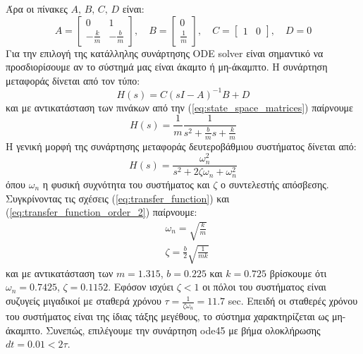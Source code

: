 \documentclass[a4paper,12pt]{article}
\begin{document}
Άρα οι πίνακες $A, \, B, \, C, \, D$ είναι:
\begin{equation}
    A = 
    \begin{bmatrix}
        0 & 1 \\
        -\frac{k}{m} & -\frac{b}{m}
    \end{bmatrix}, \quad B = 
    \begin{bmatrix}
        0 \\
        \frac{1}{m}
    \end{bmatrix}, \quad C = 
    \begin{bmatrix}
        1 & 0
    \end{bmatrix}, \quad D = 0
    \label{eq:state_space_matrices}
\end{equation}
Για την επιλογή της κατάλληλης συνάρτησης ODE solver είναι
σημαντικό να προσδιορίσουμε αν το σύστημά μας είναι άκαμτο ή μη-άκαμπτο. Η συνάρτηση μεταφοράς δίνεται από
τον τύπο:
\begin{equation*}
    H(s) = C(sI-A)^{-1}B + D
\end{equation*}
και με αντικατάσταση των πινάκων από την (\ref{eq:state_space_matrices}) παίρνουμε
\begin{equation}
    H(s) = \frac{1}{m} \frac{1}{s^2 + \frac{b}{m}s + \frac{k}{m}}
    \label{eq:transfer_function}
\end{equation}
Η γενική μορφή της συνάρτησης μεταφοράς δευτεροβάθμιου συστήματος δίνεται από:
\begin{equation}
    H(s) = \frac{\omega_n^2}{s^2 + 2 \zeta \omega_n + \omega_n^2}
    \label{eq:transfer_function_order_2}
\end{equation}
όπου $\omega_n$ η φυσική συχνότητα του συστήματος και $\zeta$ ο συντελεστής απόσβεσης.
Συγκρίνοντας τις σχέσεις (\ref{eq:transfer_function}) και (\ref{eq:transfer_function_order_2}) παίρνουμε:
\begin{equation*}
    \begin{aligned}
        &\omega_n = \sqrt{\frac{k}{m}} \\
        &\zeta = \frac{b}{2}\sqrt{\frac{1}{mk}}
    \end{aligned}
\end{equation*}
και με αντικατάσταση των $m=1.315$, $b=0.225$ και $k=0.725$ βρίσκουμε ότι $\omega_n = 0.7425$, 
$ \zeta = 0.1152$. Εφόσον ισχύει $\zeta < 1$ οι πόλοι του συστήματος είναι συζυγείς μιγαδικοί με σταθερά 
χρόνου $\tau = \frac{1}{\zeta \omega_n} = 11.7$ sec. Επειδή
οι σταθερές χρόνου του συστήματος είναι της ίδιας τάξης μεγέθους, το σύστημα χαρακτηρίζεται ως μη-άκαμπτο.
Συνεπώς, επιλέγουμε την συνάρτηση ode45 με βήμα ολοκλήρωσης 
$dt = 0.01 < 2 \tau$.
\end{document}
